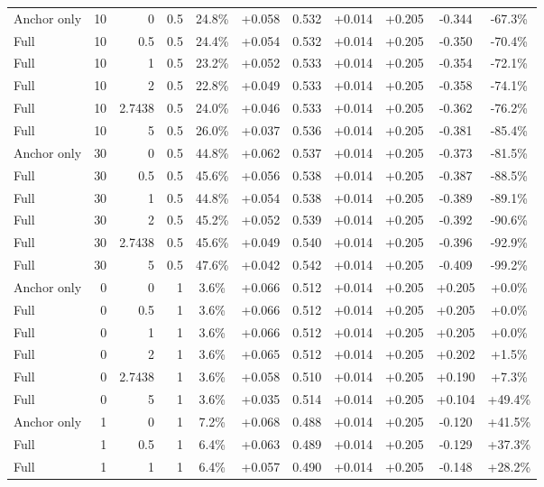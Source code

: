 \begin{table}[htbp]
\begin{tabular}{lrrrccccccc}
Anchor only & 10 & 0 & 0.5 & 24.8\% & +0.058 & 0.532 & +0.014 & +0.205 & -0.344 & -67.3\% \\
Full & 10 & 0.5 & 0.5 & 24.4\% & +0.054 & 0.532 & +0.014 & +0.205 & -0.350 & -70.4\% \\
Full & 10 & 1 & 0.5 & 23.2\% & +0.052 & 0.533 & +0.014 & +0.205 & -0.354 & -72.1\% \\
Full & 10 & 2 & 0.5 & 22.8\% & +0.049 & 0.533 & +0.014 & +0.205 & -0.358 & -74.1\% \\
Full & 10 & 2.7438 & 0.5 & 24.0\% & +0.046 & 0.533 & +0.014 & +0.205 & -0.362 & -76.2\% \\
Full & 10 & 5 & 0.5 & 26.0\% & +0.037 & 0.536 & +0.014 & +0.205 & -0.381 & -85.4\% \\
Anchor only & 30 & 0 & 0.5 & 44.8\% & +0.062 & 0.537 & +0.014 & +0.205 & -0.373 & -81.5\% \\
Full & 30 & 0.5 & 0.5 & 45.6\% & +0.056 & 0.538 & +0.014 & +0.205 & -0.387 & -88.5\% \\
Full & 30 & 1 & 0.5 & 44.8\% & +0.054 & 0.538 & +0.014 & +0.205 & -0.389 & -89.1\% \\
Full & 30 & 2 & 0.5 & 45.2\% & +0.052 & 0.539 & +0.014 & +0.205 & -0.392 & -90.6\% \\
Full & 30 & 2.7438 & 0.5 & 45.6\% & +0.049 & 0.540 & +0.014 & +0.205 & -0.396 & -92.9\% \\
Full & 30 & 5 & 0.5 & 47.6\% & +0.042 & 0.542 & +0.014 & +0.205 & -0.409 & -99.2\% \\
Anchor only & 0 & 0 & 1 & 3.6\% & +0.066 & 0.512 & +0.014 & +0.205 & +0.205 & +0.0\% \\
Full & 0 & 0.5 & 1 & 3.6\% & +0.066 & 0.512 & +0.014 & +0.205 & +0.205 & +0.0\% \\
Full & 0 & 1 & 1 & 3.6\% & +0.066 & 0.512 & +0.014 & +0.205 & +0.205 & +0.0\% \\
Full & 0 & 2 & 1 & 3.6\% & +0.065 & 0.512 & +0.014 & +0.205 & +0.202 & +1.5\% \\
Full & 0 & 2.7438 & 1 & 3.6\% & +0.058 & 0.510 & +0.014 & +0.205 & +0.190 & +7.3\% \\
Full & 0 & 5 & 1 & 3.6\% & +0.035 & 0.514 & +0.014 & +0.205 & +0.104 & +49.4\% \\
Anchor only & 1 & 0 & 1 & 7.2\% & +0.068 & 0.488 & +0.014 & +0.205 & -0.120 & +41.5\% \\
Full & 1 & 0.5 & 1 & 6.4\% & +0.063 & 0.489 & +0.014 & +0.205 & -0.129 & +37.3\% \\
Full & 1 & 1 & 1 & 6.4\% & +0.057 & 0.490 & +0.014 & +0.205 & -0.148 & +28.2\% \\

\end{tabular}
\end{table}
